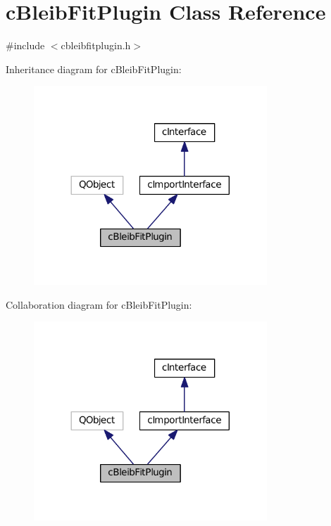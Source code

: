 \hypertarget{classc_bleib_fit_plugin}{}\section{c\+Bleib\+Fit\+Plugin Class Reference}
\label{classc_bleib_fit_plugin}


{\ttfamily \#include $<$cbleibfitplugin.\+h$>$}



Inheritance diagram for c\+Bleib\+Fit\+Plugin\+:
\nopagebreak
\begin{figure}[H]
\begin{center}
\leavevmode
\includegraphics[width=248pt]{classc_bleib_fit_plugin__inherit__graph}
\end{center}
\end{figure}


Collaboration diagram for c\+Bleib\+Fit\+Plugin\+:
\nopagebreak
\begin{figure}[H]
\begin{center}
\leavevmode
\includegraphics[width=248pt]{classc_bleib_fit_plugin__coll__graph}
\end{center}
\end{figure}
